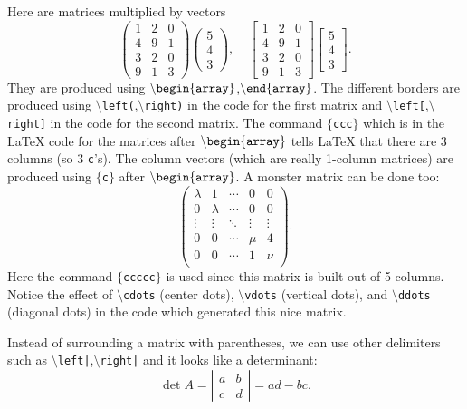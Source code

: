 \documentclass[12pt,letterpaper]{amsart}
\newcommand{\latex}{\LaTeX}
\newcommand{\sm}{\setminus}
\newcommand{\pln}[1]{$\sm${\tt #1}}
\newcommand{\bgn}[1]{$\tt {\sm}begin\{#1\}$}
\newcommand{\nd}[1]{$\tt {\sm}end\{#1\}$}
\theoremstyle{plain}
\theoremstyle{definition}
\numberwithin{equation}{section}
\begin{document}
Here are matrices multiplied by vectors
$$
\left(
\begin{array}{ccc}
1 & 2 & 0 \\
4 & 9 & 1 \\
3 & 2 & 0 \\
9 & 1 & 3 
\end{array}
\right)
\left(
\begin{array}{c}
5 \\ 4 \\ 3 
\end{array}
\right), 
\ \ \ \ \ 
\left[
\begin{array}{ccc}
1 & 2 & 0 \\
4 & 9 & 1 \\
3 & 2 & 0 \\
9 & 1 & 3 
\end{array}
\right]
\left[
\begin{array}{c}
5 \\ 4 \\ 3 
\end{array}
\right].
$$
They are produced using 
\bgn{array},\nd{array}.
The different borders are produced using 
\pln{left(},\pln{right)} in the code for the first matrix and 
\pln{left[},\pln{right]} in the code for the second matrix. 
The command {\tt $\{$ccc$\}$}
which is in the \latex{} 
code for the matrices after \bgn{array}
tells \latex{} that there are 3 columns (so 3 {\tt c}'s). 
The column vectors (which are really 1-column matrices) 
are produced using {\tt $\{$c$\}$} after 
\bgn{array}.
A monster matrix can be done too:
$$
\left(
\begin{array}{ccccc}
\lambda & 1 & \cdots & 0 & 0 \\
0 & \lambda & \cdots & 0 & 0 \\
\vdots & \vdots & \ddots & \vdots & \vdots\\
0 & 0 & \cdots & \mu & 4 \\
0 & 0 & \cdots & 1 & \nu \\
\end{array}
\right).
$$
Here the command 
{\tt $\{$ccccc$\}$} is used since this matrix is built out of 
5 columns.
Notice the effect of \pln{cdots} (center dots), 
\pln{vdots} (vertical dots), and \pln{ddots} (diagonal dots) 
in the code which generated this nice matrix. 

Instead of surrounding a matrix with parentheses, we can 
use other delimiters such as 
\pln{left|},\pln{right|} and it looks like a determinant: 
$$
\det A = 
\left|
\begin{array}{cc}
a & b \\
c & d 
\end{array}
\right| = ad - bc.
$$
\end{document}
